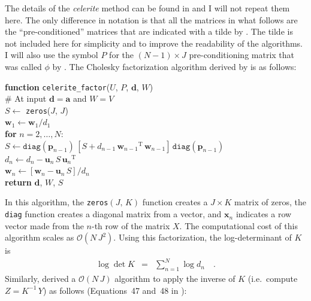 \documentclass[rnaas]{aastex62}
\newcommand{\T}{\ensuremath{\mathrm{T}}}
\newcommand{\bvec}[1]{{\ensuremath{\boldsymbol{#1}}}}
\begin{document}
The details of the \emph{celerite} method can be found in
\citet{Foreman-Mackey:2017} and I will not repeat them here.
The only difference in notation is that all the matrices in what follows are
the ``pre-conditioned'' matrices that are indicated with a tilde by
\citet{Foreman-Mackey:2017}.
The tilde is not included here for simplicity and to improve the readability
of the algorithms.
I will also use the symbol $P$ for the $(N-1) \times J$ pre-conditioning matrix
that was called $\phi$ by \citet{Foreman-Mackey:2017}.
The Cholesky factorization algorithm derived by \citet[][their
Equation~46]{Foreman-Mackey:2017} is as follows:

\medskip
\begin{minipage}{\linewidth}
\textbf{function} \texttt{celerite\_factor}($U$, $P$, $\bvec{d}$, $W$) \\
\hspace*{2em}\textsf{\# At input $\bvec{d} = \bvec{a}$ and $W = V$} \\
\hspace*{2em}$S \gets$ \texttt{zeros}($J$, $J$) \\
    \hspace*{2em}$\bvec{w}_1 \gets \bvec{w}_1 / d_{1}$ \\
\hspace*{2em}\textbf{for} $n = 2,\ldots,N$:\\
\hspace*{2em}\hspace*{2em}$S \gets \texttt{diag}(\bvec{p}_{n-1})\,[
    S + d_{n-1}\,{\bvec{w}_{n-1}}^\T\,{\bvec{w}_{n-1}}
]\,\texttt{diag}(\bvec{p}_{n-1})$ \\
\hspace*{2em}\hspace*{2em}$d_{n} \gets d_{n} - \bvec{u}_n\,S\,{\bvec{u}_n}^\T$\\
\hspace*{2em}\hspace*{2em}$\bvec{w}_n \gets \left[\bvec{w}_n -
    \bvec{u}_n\,S \right] / d_{n}$\\
    \hspace*{2em}\textbf{return} $\bvec{d}$, $W$, $S$
\end{minipage}
\medskip

\noindent In this algorithm, the \texttt{zeros}$(J,\,K)$ function creates a $J
\times K$ matrix of zeros, the \texttt{diag} function creates a diagonal
matrix from a vector, and $\bvec{x}_n$ indicates a row vector made from the
$n$-th row of the matrix $X$.
The computational cost of this algorithm scales as $\mathcal{O}(N\,J^2)$.
Using this factorization, the log-determinant of $K$ is
\begin{eqnarray}
\log \det K &=& \sum_{n=1}^N \log d_{n} \quad.
\end{eqnarray}
Similarly, \citet{Foreman-Mackey:2017} derived a $\mathcal{O}(N\,J)$ algorithm
to apply the inverse of $K$ (i.e.\ compute $Z = K^{-1}\,Y$) as follows
(Equations~47 and~48 in \citealt{Foreman-Mackey:2017}):
\end{document}
